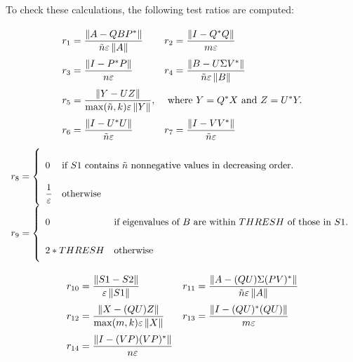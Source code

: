 To check these calculations, the following test ratios are computed:
\begin{displaymath}
   \bigarray
   \renewcommand{\arraystretch}{2.5}
   \begin{array}{ll}
	r_1 = \frac{ \leftnorm A - Q B P^* \rightnorm }
                   { \tilde n \varepsilon \leftnorm A\rightnorm } &
	r_2 = \frac{ \leftnorm I - Q^* Q   \rightnorm }
                   { m         \varepsilon } \\
	r_3 = \frac{ \leftnorm I - P^* P   \rightnorm }
                   { n         \varepsilon } &
	r_4 = \frac{ \leftnorm B - U \Sigma V^*   \rightnorm }
                   { \tilde n \varepsilon \leftnorm B\rightnorm } \\
        r_5 = \frac{ \leftnorm Y - U Z \rightnorm}
		   { \max(\tilde n,k) \varepsilon \leftnorm Y \rightnorm },
		   & \mbox{\ where\ }Y = Q^* X \mbox{\ and\ } Z = U^* Y.  \\
	r_6 = \frac{ \leftnorm I - U^* U   \rightnorm }
                   { \tilde n  \varepsilon } &
	r_7 = \frac{ \leftnorm I - V V^*   \rightnorm }
                   { \tilde n  \varepsilon } \\
    \end{array}
\end{displaymath}
\begin{displaymath}
   \bigarray
   \renewcommand{\arraystretch}{2.5}
   \begin{array}{ll}
        r_8 =  \left\{
                  \begin{array}{ll}
		    0 & \mbox{if $S1$ contains $\tilde n$ nonnegative values
                          in decreasing order.} \\
		    \frac{1}{\varepsilon} & \mbox{otherwise}
		  \end{array}
	     \right. \\
	r_9 =  \left\{
              \begin{array}{ll}
                 0 & \mbox{if eigenvalues of $B$ are within $THRESH$ of those
            			 in $S1$.} \\
                 2*THRESH & \mbox{otherwise}
              \end{array} \right. \\
    \end{array}
\end{displaymath}
\begin{displaymath}
   \bigarray
   \renewcommand{\arraystretch}{2.5}
   \begin{array}{ll}
	r_{10}=\frac{\leftnorm S1 - S2 \rightnorm}
                   { \varepsilon \leftnorm S1\rightnorm } &
	r_{11} = \frac{ \leftnorm A-(QU)\Sigma(PV)^*\rightnorm}
                   { \tilde n \varepsilon \leftnorm A\rightnorm } \\
	r_{12}=\frac{\leftnorm X - (QU) Z   \rightnorm }
                   { \max( m, k )\varepsilon \leftnorm X\rightnorm } &
	r_{13}=\frac{\leftnorm I - (QU)^* (QU)   \rightnorm }
                   { m         \varepsilon } \\
	r_{14}=\frac{\leftnorm I -(VP)(VP)^*\rightnorm}
                   { n        \varepsilon } 
    \end{array}
\end{displaymath}
